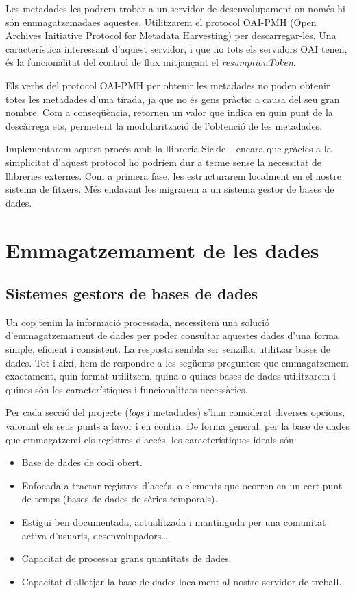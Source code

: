 \documentclass[lettersize,journal]{IEEEtran}
\begin{document}
Les metadades les podrem trobar a un servidor de desenvolupament on només hi són emmagatzemadaes aquestes.
Utilitzarem el protocol OAI-PMH (Open Archives Initiative Protocol for Metadata Harvesting) per descarregar-les.
Una característica interessant d'aquest servidor, i que no tots els servidors OAI tenen, és la funcionalitat del control de flux mitjançant el \textit{resumptionToken}.

Els verbs del protocol OAI-PMH per obtenir les metadades no poden obtenir totes les metadades d'una tirada, ja que no és gens pràctic a causa del seu gran nombre.
Com a conseqüència, retornen un valor que indica en quin punt de la descàrrega ets, permetent la modularització de l'obtenció de les metadades.

Implementarem aquest procés amb la llibreria Sickle~\cite{Sickle}, encara que gràcies a la simplicitat d'aquest protocol ho podríem dur a terme sense la necessitat de llibreries externes.
Com a primera fase, les estructurarem localment en el nostre sistema de fitxers.
Més endavant les migrarem a un sistema gestor de bases de dades.


\section{Emmagatzemament de les dades}\label{sec:data-storing}
\subsection{Sistemes gestors de bases de dades}\label{subsec:data-storing-requirements}
Un cop tenim la informació processada, necessitem una solució d'emmagatzemament de dades per poder consultar aquestes dades d'una forma simple, eficient i consistent.
La resposta sembla ser senzilla: utilitzar bases de dades.
Tot i així, hem de respondre a les següents preguntes: que emmagatzemem exactament, quin format utilitzem, quina o quines bases de dades utilitzarem i quines són les característiques i funcionalitats necessàries.

Per cada secció del projecte (\textit{logs} i metadades) s'han considerat diverses opcions, valorant els seus punts a favor i en contra.
De forma general, per la base de dades que emmagatzemi els registres d'accés, les característiques ideals són:
\begin{itemize}
    \item Base de dades de codi obert.
    \item Enfocada a tractar registres d'accés, o elements que ocorren en un cert punt de temps (bases de dades de sèries temporals).
    \item Estigui ben documentada, actualitzada i mantinguda per una comunitat activa d'usuaris, desenvolupadors\dots
    \item Capacitat de processar grans quantitats de dades.
    \item Capacitat d'allotjar la base de dades localment al nostre servidor de treball.
\end{itemize}
\end{document}
